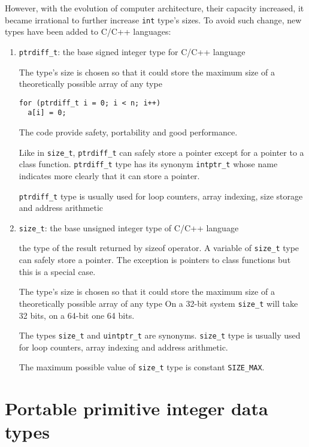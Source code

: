 However, with the evolution of computer architecture, their capacity increased,
it became irrational to further increase \verb!int! type's sizes. To avoid such
change, new types have been added to C/C++ languages:
\begin{enumerate}
  \item \verb!ptrdiff_t!: the base signed integer type for C/C++ language
  
  The type's size is chosen so that it could store the maximum size of a theoretically possible array of any type
  
\begin{lstlisting}
for (ptrdiff_t i = 0; i < n; i++)
  a[i] = 0;
\end{lstlisting}

The code provide safety, portability and good performance. 
 
Like in \verb!size_t!, \verb!ptrdiff_t! can safely store a pointer except for a pointer to a class function. 
\verb!ptrdiff_t! type has its synonym \verb!intptr_t! whose name indicates more clearly that it can store a pointer.


\verb!ptrdiff_t! type is usually used for loop counters, array indexing, size storage and address arithmetic

 
  \item \verb!size_t!: the base unsigned integer type of C/C++ language
  
  the type of the result returned by sizeof operator. A
  variable of \verb!size_t! type can safely store a pointer.
  The exception is pointers to class functions but this is a special case.
   
The type's size is chosen so that it could store the maximum size of a
theoretically possible array of any type On a 32-bit system \verb!size_t! will
take 32 bits, on a 64-bit one 64 bits.

The types \verb!size_t! and \verb!uintptr_t! are synonyms. \verb!size_t! type is
usually used for loop counters, array indexing and address arithmetic.

The maximum possible value of \verb!size_t! type is constant \verb!SIZE_MAX!.

\end{enumerate}



\section{Portable primitive integer data types}
\label{sec:integer}

